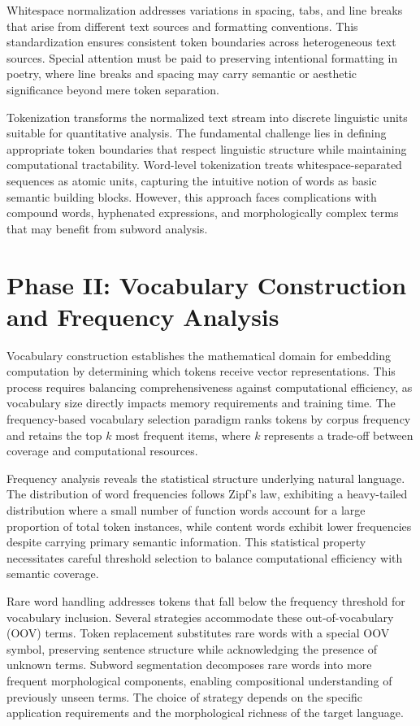 \documentclass[11pt,a4paper]{article}
\begin{document}
Whitespace normalization addresses variations in spacing, tabs, and line breaks that arise from different text sources and formatting conventions. This standardization ensures consistent token boundaries across heterogeneous text sources. Special attention must be paid to preserving intentional formatting in poetry, where line breaks and spacing may carry semantic or aesthetic significance beyond mere token separation.

Tokenization transforms the normalized text stream into discrete linguistic units suitable for quantitative analysis. The fundamental challenge lies in defining appropriate token boundaries that respect linguistic structure while maintaining computational tractability. Word-level tokenization treats whitespace-separated sequences as atomic units, capturing the intuitive notion of words as basic semantic building blocks. However, this approach faces complications with compound words, hyphenated expressions, and morphologically complex terms that may benefit from subword analysis.

\section{Phase II: Vocabulary Construction and Frequency Analysis}

Vocabulary construction establishes the mathematical domain for embedding computation by determining which tokens receive vector representations. This process requires balancing comprehensiveness against computational efficiency, as vocabulary size directly impacts memory requirements and training time. The frequency-based vocabulary selection paradigm ranks tokens by corpus frequency and retains the top $k$ most frequent items, where $k$ represents a trade-off between coverage and computational resources.

Frequency analysis reveals the statistical structure underlying natural language. The distribution of word frequencies follows Zipf's law, exhibiting a heavy-tailed distribution where a small number of function words account for a large proportion of total token instances, while content words exhibit lower frequencies despite carrying primary semantic information. This statistical property necessitates careful threshold selection to balance computational efficiency with semantic coverage.

Rare word handling addresses tokens that fall below the frequency threshold for vocabulary inclusion. Several strategies accommodate these out-of-vocabulary (OOV) terms. Token replacement substitutes rare words with a special OOV symbol, preserving sentence structure while acknowledging the presence of unknown terms. Subword segmentation decomposes rare words into more frequent morphological components, enabling compositional understanding of previously unseen terms. The choice of strategy depends on the specific application requirements and the morphological richness of the target language.
\end{document}
